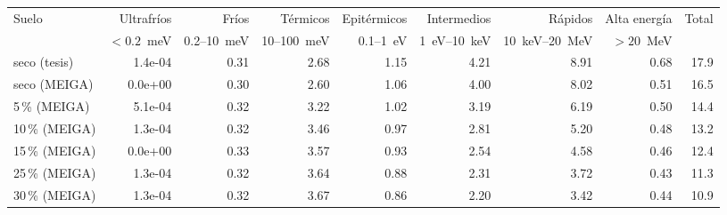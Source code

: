 \begin{tabular}{lrrrrrrrr}
\toprule
Suelo & Ultrafríos & Fríos & Térmicos & Epitérmicos & Intermedios & Rápidos & Alta energía & Total \\
 & \scriptsize $<0.2$~meV & \scriptsize 0.2--10~meV & \scriptsize 10--100~meV & \scriptsize 0.1--1~eV & \scriptsize 1~eV--10~keV & \scriptsize 10~keV--20~MeV & \scriptsize $>20$~MeV & \\
\midrule
seco (tesis) & 1.4e-04 & 0.31 & 2.68 & 1.15 & 4.21 & 8.91 & 0.68 & 17.9 \\
seco (MEIGA) & 0.0e+00 & 0.30 & 2.60 & 1.06 & 4.00 & 8.02 & 0.51 & 16.5 \\
5\,\% (MEIGA) & 5.1e-04 & 0.32 & 3.22 & 1.02 & 3.19 & 6.19 & 0.50 & 14.4 \\
10\,\% (MEIGA) & 1.3e-04 & 0.32 & 3.46 & 0.97 & 2.81 & 5.20 & 0.48 & 13.2 \\
15\,\% (MEIGA) & 0.0e+00 & 0.33 & 3.57 & 0.93 & 2.54 & 4.58 & 0.46 & 12.4 \\
25\,\% (MEIGA) & 1.3e-04 & 0.32 & 3.64 & 0.88 & 2.31 & 3.72 & 0.43 & 11.3 \\
30\,\% (MEIGA) & 1.3e-04 & 0.32 & 3.67 & 0.86 & 2.20 & 3.42 & 0.44 & 10.9 \\
\bottomrule
\end{tabular}
